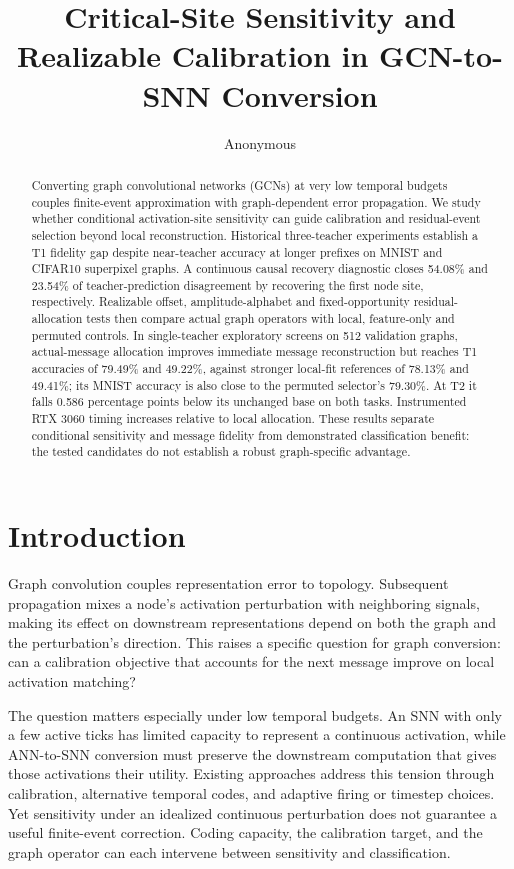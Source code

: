 \documentclass{article}
\title{Critical-Site Sensitivity and Realizable Calibration in GCN-to-SNN Conversion}
\author{Anonymous}
\begin{document}
\begin{abstract}
Converting graph convolutional networks (GCNs) at very low temporal budgets couples finite-event approximation with graph-dependent error propagation. We study whether conditional activation-site sensitivity can guide calibration and residual-event selection beyond local reconstruction. Historical three-teacher experiments establish a T1 fidelity gap despite near-teacher accuracy at longer prefixes on MNIST and CIFAR10 superpixel graphs. A continuous causal recovery diagnostic closes 54.08\% and 23.54\% of teacher-prediction disagreement by recovering the first node site, respectively. Realizable offset, amplitude-alphabet and fixed-opportunity residual-allocation tests then compare actual graph operators with local, feature-only and permuted controls. In single-teacher exploratory screens on 512 validation graphs, actual-message allocation improves immediate message reconstruction but reaches T1 accuracies of 79.49\% and 49.22\%, against stronger local-fit references of 78.13\% and 49.41\%; its MNIST accuracy is also close to the permuted selector's 79.30\%. At T2 it falls 0.586 percentage points below its unchanged base on both tasks. Instrumented RTX 3060 timing increases relative to local allocation. These results separate conditional sensitivity and message fidelity from demonstrated classification benefit: the tested candidates do not establish a robust graph-specific advantage.
\end{abstract}

\maketitle

\section{Introduction}

\label{sec:introduction}

Graph convolution couples representation error to topology. Subsequent propagation mixes a node's activation perturbation with neighboring signals, making its effect on downstream representations depend on both the graph and the perturbation's direction. This raises a specific question for graph conversion: can a calibration objective that accounts for the next message improve on local activation matching?

The question matters especially under low temporal budgets. An SNN with only a few active ticks has limited capacity to represent a continuous activation, while ANN-to-SNN conversion must preserve the downstream computation that gives those activations their utility. Existing approaches address this tension through calibration, alternative temporal codes, and adaptive firing or timestep choices. Yet sensitivity under an idealized continuous perturbation does not guarantee a useful finite-event correction. Coding capacity, the calibration target, and the graph operator can each intervene between sensitivity and classification.
\end{document}

